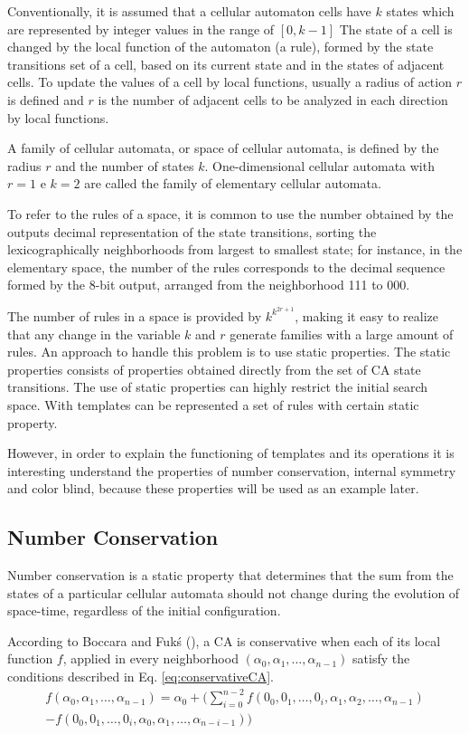 \documentclass{llncs}
\begin{document}
Conventionally, it is assumed that a cellular automaton cells have $k$ states which are represented by integer values in the range of $[0, k-1]$ The state of a cell is changed by the local function of the automaton (a rule), formed by the state transitions set of a cell, based on its current state and in the states of adjacent cells. To update the values of a cell by local functions, usually a radius of action $r$ is defined and $r$ is the number of adjacent cells to be analyzed in each direction by local functions.

A family of cellular automata, or space of cellular automata, is defined by the radius $r$ and the number of states $k$. One-dimensional cellular automata with $r=1$ e $k=2$ are called the family of elementary cellular automata.

To refer to the rules of a space, it is common to use the number obtained by the outputs decimal representation  of the state transitions, sorting the lexicographically neighborhoods from largest to smallest state; for instance, in the elementary space, the number of the rules corresponds to the decimal sequence formed by the 8-bit output, arranged from the neighborhood 111 to 000.

The number of rules in a space is provided by $k^{k^{2r+1}}$, making it easy to realize that any change in the variable $k$ and $r$ generate families with a large amount of rules. An approach to handle this problem is to use static properties. The static properties consists of properties obtained directly from the set of CA state transitions. The use of static properties can highly restrict the initial search space. With templates can be represented a set of rules with certain static property.

However, in order to explain the functioning of templates and its operations it is interesting understand the properties of number conservation, internal symmetry and color blind, because these properties will be used as an example later.

\subsection{Number Conservation}
Number conservation is a static property that determines that the sum from the states of a particular cellular automata should not change during the evolution of space-time, regardless of the initial configuration.

According to Boccara and Fukś (\cite{boccara2002}), a CA is conservative when each of its local function $f$, applied in every neighborhood $(\alpha_0,\alpha_1, \dots, \alpha_{n-1})$ satisfy the conditions described in Eq. \ref{eq:conservativeCA}.
\begin{equation}
\begin{split}
f(\alpha_0,\alpha_1, \dots,\alpha_{n-1}) = \alpha_0 + (\sum_{i=0}^{n-2}f(0_0,0_1, \dots,0_i,\alpha_1,\alpha_2, \dots,\alpha_{n-1}) \\- f(0_0,0_1, \dots,0_i,\alpha_0,\alpha_1, \dots,\alpha_{n-i-1}))
\label{eq:conservativeCA}
\end{split}
\end{equation}
\end{document}
